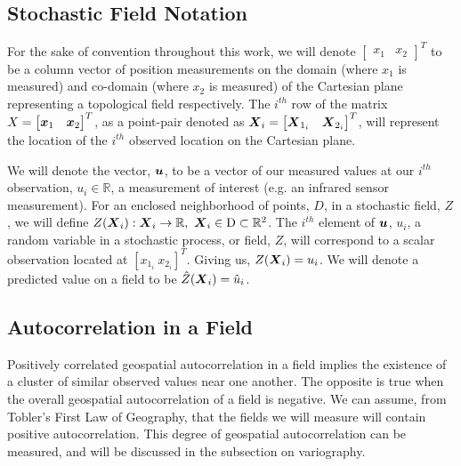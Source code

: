 \documentclass[11pt]{ucthesis}
\newcommand{\vect}[1]{{\it{\boldsymbol{#1}}}}
\begin{document}
\subsection{Stochastic Field Notation}
For the sake of convention throughout this work, we will denote $\begin{bmatrix} x_1 & x_2 \end{bmatrix}^{T}$ to be a column vector of position measurements on the domain (where $x_1$ is measured) and co-domain (where $x_2$ is measured) of the Cartesian plane representing a topological field respectively. The $i^{th}$ row of the matrix $X = \begin{bmatrix} \vect{x}_1 & \vect{x}_2 \end{bmatrix}^{T}$, as a point-pair denoted as $\vect{X}_i = \begin{bmatrix} \vect{X}_{1_i} & \vect{X}_{2_i} \end{bmatrix}^{T}$, will represent the location of the $i^{th}$ observed location on the Cartesian plane.

We will denote the vector, $\vect{u}$, to be a vector of our measured values at our $i^{th}$ observation, $u_i \in \mathbb{R}$, a measurement of interest (e.g. an infrared sensor measurement). For an enclosed neighborhood of points, $D$, in a stochastic field, $Z$, we will define $Z(\vect{X}_i): \vect{X}_i \rightarrow \mathbb{R},\ \vect{X}_i \in \rm{D} \subset \mathbb{R}^2$. The $i^{th}$ element of $\vect{u}$, $u_i$, a random variable in a stochastic process, or field, $Z$, will correspond to a scalar observation located at $[x_{1_i}\ x_{2_i}]^{T}$. Giving us, $Z(\vect{X}_i)=u_i$. We will denote a predicted value on a field to be $\hat{Z}(\vect{X}_i)=\hat{u}_i$.

\subsection{Autocorrelation in a Field}
Positively correlated geospatial autocorrelation in a field implies the existence of a cluster of similar observed values near one another. The opposite is true when the overall geospatial autocorrelation of a field is negative. We can assume, from Tobler's First Law of Geography, that the fields we will measure will contain positive autocorrelation. This degree of geospatial autocorrelation can be measured, and will be discussed in the subsection on variography.
\end{document}
